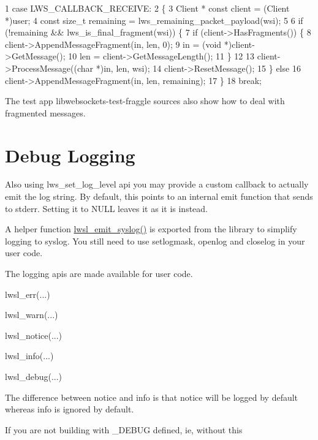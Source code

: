 \begin{DoxyCode}
1 case LWS\_CALLBACK\_RECEIVE:
2 \{
3     Client * const client = (Client *)user;
4     const size\_t remaining = lws\_remaining\_packet\_payload(wsi);
5 
6     if (!remaining && lws\_is\_final\_fragment(wsi)) \{
7         if (client->HasFragments()) \{
8             client->AppendMessageFragment(in, len, 0);
9             in = (void *)client->GetMessage();
10             len = client->GetMessageLength();
11         \}
12 
13         client->ProcessMessage((char *)in, len, wsi);
14         client->ResetMessage();
15     \} else
16         client->AppendMessageFragment(in, len, remaining);
17 \}
18 break;
\end{DoxyCode}


The test app libwebsockets-\/test-\/fraggle sources also show how to deal with fragmented messages.\hypertarget{md_README.coding_debuglog}{}\section{Debug Logging}\label{md_README.coding_debuglog}
Also using {\ttfamily lws\+\_\+set\+\_\+log\+\_\+level} api you may provide a custom callback to actually emit the log string. By default, this points to an internal emit function that sends to stderr. Setting it to {\ttfamily N\+U\+LL} leaves it as it is instead.

A helper function {\ttfamily \hyperlink{group__log_gab7c0fc936cc9f1eb58e2bb234c15147c}{lwsl\+\_\+emit\+\_\+syslog()}} is exported from the library to simplify logging to syslog. You still need to use {\ttfamily setlogmask}, {\ttfamily openlog} and {\ttfamily closelog} in your user code.

The logging apis are made available for user code.


\begin{DoxyItemize}
\item {\ttfamily lwsl\+\_\+err(...)}
\item {\ttfamily lwsl\+\_\+warn(...)}
\item {\ttfamily lwsl\+\_\+notice(...)}
\item {\ttfamily lwsl\+\_\+info(...)}
\item {\ttfamily lwsl\+\_\+debug(...)}
\end{DoxyItemize}

The difference between notice and info is that notice will be logged by default whereas info is ignored by default.

If you are not building with \+\_\+\+D\+E\+B\+UG defined, ie, without this


